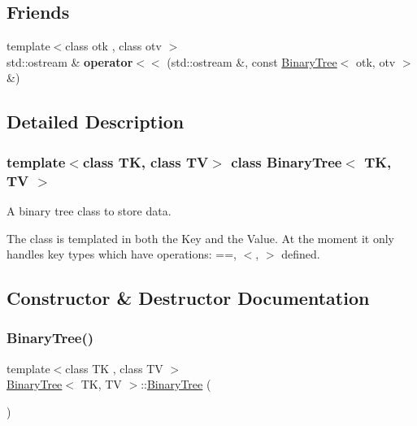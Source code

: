\subsection*{Friends}
\begin{DoxyCompactItemize}
\item 
\mbox{\label{classBinaryTree_a9352b744993dfd3558fcd8c7dcba4e20}} 
{\footnotesize template$<$class otk , class otv $>$ }\\std\+::ostream \& {\bfseries operator$<$$<$} (std\+::ostream \&, const \mbox{\hyperlink{classBinaryTree}{Binary\+Tree}}$<$ otk, otv $>$ \&)
\end{DoxyCompactItemize}


\subsection{Detailed Description}
\subsubsection*{template$<$class TK, class TV$>$\newline
class Binary\+Tree$<$ T\+K, T\+V $>$}

A binary tree class to store data. 

The class is templated in both the Key and the Value. At the moment it only handles key types which have operations\+: ==, $<$, $>$ defined. 

\subsection{Constructor \& Destructor Documentation}
\mbox{\label{classBinaryTree_a18b4981a8d885a296b144462729c0679}} 
\subsubsection{\texorpdfstring{BinaryTree()}{BinaryTree()}\hspace{0.1cm}{\footnotesize\ttfamily [1/3]}}
{\footnotesize\ttfamily template$<$class TK , class TV $>$ \\
\mbox{\hyperlink{classBinaryTree}{Binary\+Tree}}$<$ TK, TV $>$\+::\mbox{\hyperlink{classBinaryTree}{Binary\+Tree}} (\begin{DoxyParamCaption}{ }\end{DoxyParamCaption})\hspace{0.3cm}{\ttfamily [inline]}}

